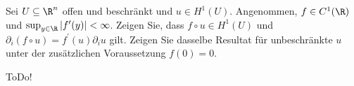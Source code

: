 
\begin{exercise}

Sei $U \subseteq \R^n$ offen und beschränkt und $u \in H^1(U)$.
Angenommen, $f \in C^1(\R)$ und $\sup_{y \in \R} |f^\prime(y)| < \infty$. Zeigen Sie, dass $f \circ u \in H^1(U)$ und $\partial_i(f \circ u) = f^\prime(u) \partial_i u$ gilt.
Zeigen Sie dasselbe Resultat für unbeschränkte $u$ unter der zusätzlichen Voraussetzung $f(0) = 0$.

\end{exercise}


\begin{solution}

ToDo!

\end{solution}

